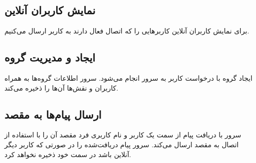 \documentclass{article}
\begin{document}
\subsection{نمایش کاربران آنلاین}
برای نمایش کاربران آنلاین کاربرهایی را که اتصال  فعال دارند به کاربر ارسال می‌کنیم.

\subsection{ایجاد و مدیریت گروه}
ایجاد گروه با درخواست کاربر به سرور انجام می‌شود.
سرور اطلاعات گروه‌‌ها به همراه کاربران و نقش‌ها آن‌ها را ذخیره می‌کند.

\subsection{ارسال پیام‌ها به مقصد}
سرور با دریافت پیام از سمت یک کاربر و نام کاربری فرد مقصد آن را با استفاده از اتصال  به مقصد ارسال می‌کند.
سرور پیام دریافت‌شده را در صورتی که کاربر دیگر آنلاین باشد در سمت خود ذخیره نخواهد کرد.
\end{document}
